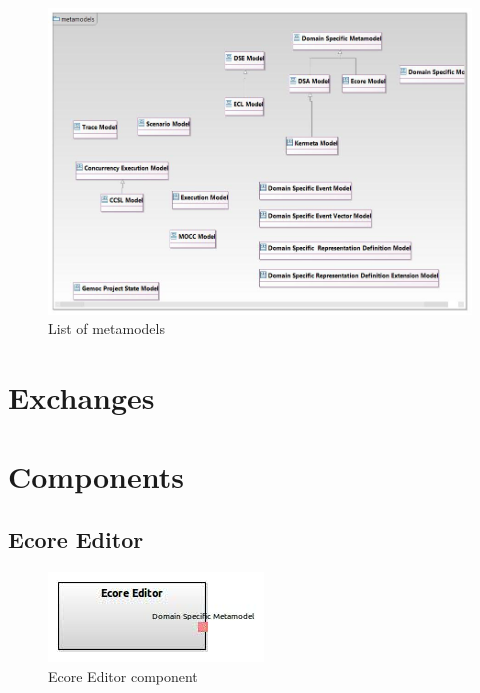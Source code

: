 \documentclass{gemoc} %
\begin{document}
\begin{figure}[htp]
	\begin{center}
	\includegraphics*[trim=0.0cm 0.0cm 0cm 0.0cm, clip=true, width=1.0\linewidth]{../images/Gemoc Metamodels Class Diagram.jpg}
	\caption{List of metamodels}
	\label{fig:MetamodelList}
	\end{center}
\end{figure}

\section{Exchanges}


\section{Components}

\subsection{Ecore Editor}

\begin{figure}[htp]
	\begin{center}
	\includegraphics*[trim=0.0cm 0.0cm 0cm 0.0cm, clip=true, scale=1.0]{../images/generated/Generated_Ecore Editor.jpg}
	\caption{Ecore Editor component}
	\end{center}
\end{figure}
\end{document}
